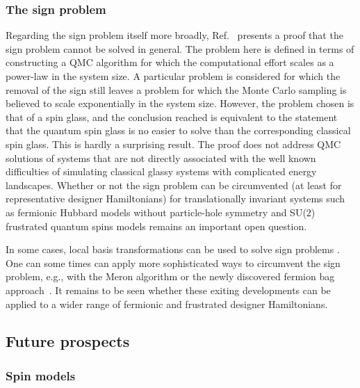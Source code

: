 \documentclass[range]{ar2e}
\begin{document}
\subsubsection{The sign problem}

Regarding the sign problem itself more broadly, Ref.~\cite{Troyer05} presents a proof that the sign problem cannot be solved in general. 
The problem here is defined in terms of constructing a QMC algorithm for which the computational effort scales as a power-law in the system
size. A particular problem is considered for which the removal of the sign still leaves a problem for which the Monte Carlo sampling is believed 
to scale exponentially in the system size. However, the problem chosen is that of a spin glass, and the conclusion reached is equivalent to
the statement that the quantum spin glass is no easier to solve than the corresponding classical spin glass. This is hardly a surprising result. 
The proof does not address QMC solutions of systems that are not directly associated with the well known difficulties of simulating 
classical glassy systems with complicated energy landscapes. Whether or not the sign problem can be circumvented (at least for representative 
designer Hamiltonians) for translationally invariant systems such as fermionic Hubbard models without particle-hole symmetry and SU($2$) frustrated 
quantum spins models remains an important open question.

In some cases, local basis transformations can be used to solve sign problems \cite{Nakamura97}. One can some times can apply more sophisticated ways to circumvent 
the sign problem, e.g., with the Meron algorithm \cite{Chandrasekharan99} or the newly discovered fermion bag approach~\cite{chandrasekharan2010:fbag}.
It remains to be seen whether these exiting developments can be applied to a wider range of fermionic and frustrated designer Hamiltonians.

\subsection{Future prospects}

\subsubsection{Spin models}
\end{document}
